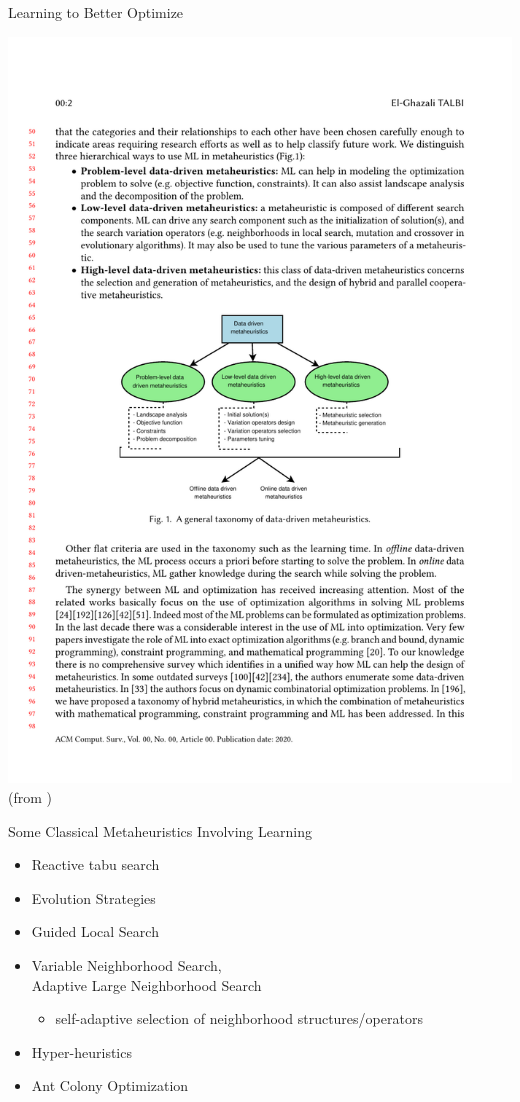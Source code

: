 \documentclass[aspectratio=1610]{beamer}
\newcommand{\important}[1]{{\color{green!60!black}#1}}
\renewcommand{\footnotesize}{\scriptsize}
\begin{document}
\begin{frame}{Learning to Better Optimize}
	\begin{center}
		\includegraphics[width=0.95\linewidth]{figures/talbi-data-driven-mhs}\\[2ex]
		\footnotesize{(from \citet{talbi-21})}
	\end{center}
\end{frame}


\begin{frame}{Some Classical Metaheuristics Involving Learning}
    \begin{itemize}
    \itemsep2.5ex
	
	\item Reactive tabu search
	\item Evolution Strategies
	\item Guided Local Search 
	\item Variable Neighborhood Search, \\
	Adaptive Large Neighborhood Search
	\begin{itemize}
		\item self-adaptive selection of neighborhood structures/operators
	\end{itemize}
	\item Hyper-heuristics
	\item Ant Colony Optimization
  \end{itemize}
\end{frame}
\end{document}
